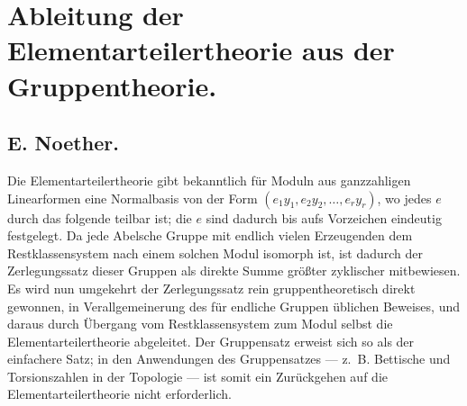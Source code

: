 \documentclass{article}
\begin{document}

\section*{Ableitung der Elementarteilertheorie aus der Gruppentheorie.}

\subsection*{E. Noether.}

Die Elementarteilertheorie gibt bekanntlich für Moduln aus ganzzahligen Linearformen eine Normalbasis von der Form $(e_1 y_1, e_2 y_2, \ldots, e_r y_r)$, wo jedes $e$ durch das folgende teilbar ist; die $e$ sind dadurch bis aufs Vorzeichen eindeutig festgelegt. Da jede Abelsche Gruppe mit endlich vielen Erzeugenden dem Restklassensystem nach einem solchen Modul isomorph ist, ist dadurch der Zerlegungssatz dieser Gruppen als direkte Summe größter zyklischer mitbewiesen. Es wird nun umgekehrt der Zerlegungssatz rein gruppentheoretisch direkt gewonnen, in Verallgemeinerung des für endliche Gruppen üblichen Beweises, und daraus durch Übergang vom Restklassensystem zum Modul selbst die Elementarteilertheorie abgeleitet. Der Gruppensatz erweist sich so als der einfachere Satz; in den Anwendungen des Gruppensatzes --- z.\ B. Bettische und Torsionszahlen in der Topologie --- ist somit ein Zurückgehen auf die Elementarteilertheorie nicht erforderlich.
\end{document}
